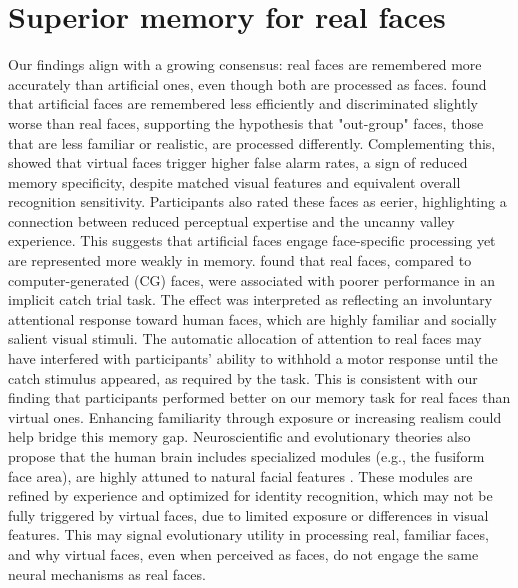 \section{Superior memory for real faces}
Our findings align with a growing consensus: real faces are remembered more accurately than artificial ones, even though both are processed as faces. 
\cite{balas_artificial_2015} found that artificial faces are remembered less efficiently and discriminated slightly worse than real faces, supporting the hypothesis that "out-group" faces, those that are less familiar or realistic, are processed differently.
Complementing this, \cite{katsyri_those_2018} showed that virtual faces trigger higher false alarm rates, a sign of reduced memory specificity, despite matched visual features and equivalent overall recognition sensitivity. 
Participants also rated these faces as eerier, highlighting a connection between reduced perceptual expertise and the uncanny valley experience. 
This suggests that artificial faces engage face-specific processing yet are represented more weakly in memory. 
\cite{katsyri_amygdala_2020} found that real faces, compared to computer-generated (CG) faces, were associated with poorer performance in an implicit catch trial task. 
The effect was interpreted as reflecting an involuntary attentional response toward human faces, which are highly familiar and socially salient visual stimuli. 
The automatic allocation of attention to real faces may have interfered with participants' ability to withhold a motor response until the catch stimulus appeared, as required by the task. 
This is consistent with our finding that participants performed better on our memory task for real faces than virtual ones.
Enhancing familiarity through exposure \citep{park_individuals_2021} or increasing realism could help bridge this memory gap. 
Neuroscientific and evolutionary theories also propose that the human brain includes specialized modules (e.g., the fusiform face area), are highly attuned to natural facial features \citep{burke_evolution_2013}. 
These modules are refined by experience and optimized for identity recognition, which may not be fully triggered by virtual faces, due to limited exposure or differences in visual features.
This may signal evolutionary utility in processing real, familiar faces, and why virtual faces, even when perceived as faces, do not engage the same neural mechanisms as real faces.


